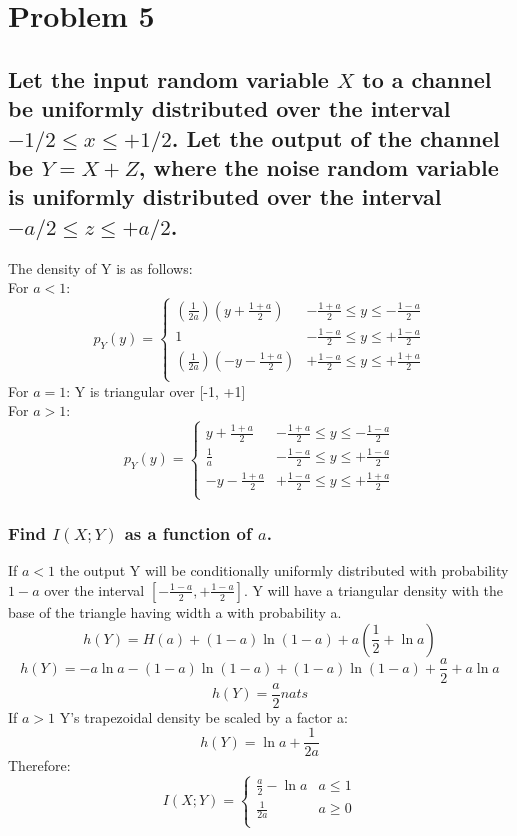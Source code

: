 \documentclass[11pt, oneside]{book}   	%
\begin{document}
\section{Problem 5}
\subsection*{Let the input random variable $X$ to a channel be uniformly distributed over the interval $-1/2 \leq x \leq +1/2$.  Let the output of the channel be $Y = X + Z$, where the noise random variable is uniformly distributed over the interval $-a/2 \leq z \leq +a/2$.}
The density of Y is as follows:\\
For $a < 1$:
\[ p_Y(y) =
  \begin{cases} 
      (\frac{1}{2a})(y+\frac{1+a}{2}) & -\frac{1+a}{2} \leq y \leq -\frac{1-a}{2} \\
      1 & -\frac{1-a}{2} \leq y \leq +\frac{1-a}{2} \\
      (\frac{1}{2a})(-y-\frac{1+a}{2}) & +\frac{1-a}{2} \leq y \leq +\frac{1+a}{2} \\
   \end{cases}
\]
For $a = 1$: Y is triangular over [-1, +1]\\
For $a>1$:
\[ p_Y(y) =
  \begin{cases} 
      y+\frac{1+a}{2} & -\frac{1+a}{2} \leq y \leq -\frac{1-a}{2} \\
      \frac{1}{a} & -\frac{1-a}{2} \leq y \leq +\frac{1-a}{2} \\
      -y-\frac{1+a}{2} & +\frac{1-a}{2} \leq y \leq +\frac{1+a}{2} \\
   \end{cases}
\]

\subsubsection{Find $I(X;Y)$ as a function of $a$.}
If $a<1$ the output Y will be conditionally uniformly distributed with probability $1-a$ over the interval $[-\frac{1-a}{2}, +\frac{1-a}{2}]$.  Y will have a triangular density with the base of the triangle having width a with probability a.
$$h(Y) = H(a) + (1-a)\ln(1-a)+a(\frac{1}{2}+\ln{a})$$
$$h(Y) = -a\ln{a} - (1-a)\ln{(1-a)} + (1-a)\ln{(1-a)} + \frac{a}{2} + a\ln{a}$$
$$h(Y) = \frac{a}{2}nats$$
If $a>1$ Y's trapezoidal density be scaled by a factor a:
$$h(Y)=\ln{a}+\frac{1}{2a}$$
Therefore:
\[ I(X;Y) =
  \begin{cases} 
	\frac{a}{2} - \ln{a} & a \leq 1 \\
	\frac{1}{2a} & a \geq 0 \\
   \end{cases}
\]
\end{document}
